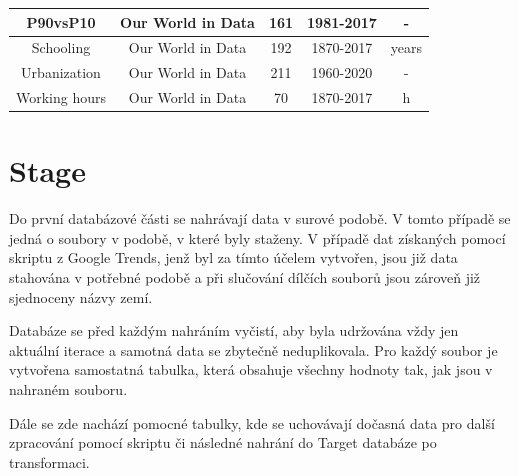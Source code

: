 \documentclass[thesis=M,czech]{FITthesis}[2022/10/08]
\begin{document}
\begin{table}[h]
{\begin{tabular}{@{}ccccc@{}}
\multicolumn{1}{|c|}{P90vsP10 \cite{p90}} &
  \multicolumn{1}{c|}{Our World in Data} &
  \multicolumn{1}{c|}{161} &
  \multicolumn{1}{c|}{1981-2017} &
  \multicolumn{1}{c|}{-} \\ \midrule
\multicolumn{1}{|c|}{Schooling \cite{schooling}} &
  \multicolumn{1}{c|}{Our World in Data} &
  \multicolumn{1}{c|}{192} &
  \multicolumn{1}{c|}{1870-2017} &
  \multicolumn{1}{c|}{years} \\ \midrule
\multicolumn{1}{|c|}{Urbanization \cite{urban}} &
  \multicolumn{1}{c|}{Our World in Data} &
  \multicolumn{1}{c|}{211} &
  \multicolumn{1}{c|}{1960-2020} &
  \multicolumn{1}{c|}{-} \\ \midrule
\multicolumn{1}{|c|}{Working hours \cite{working hours}} &
  \multicolumn{1}{c|}{Our World in Data} &
  \multicolumn{1}{c|}{70} &
  \multicolumn{1}{c|}{1870-2017} &
  \multicolumn{1}{c|}{h} \\ \midrule\bottomrule
\end{tabular}%
}
\end{table}

\section{Stage}

Do první databázové části se nahrávají data v surové podobě. V tomto případě se jedná o soubory v podobě, v které byly staženy. V případě dat získaných pomocí skriptu z Google Trends, jenž byl za tímto účelem vytvořen, jsou již data stahována v potřebné podobě a při slučování dílčích souborů jsou zároveň již sjednoceny názvy zemí. 

Databáze se před každým nahráním vyčistí, aby byla udržována vždy jen aktuální iterace a samotná data se zbytečně neduplikovala. Pro každý soubor je vytvořena samostatná tabulka, která obsahuje všechny hodnoty tak, jak jsou v nahraném souboru.

Dále se zde nachází pomocné tabulky, kde se uchovávají dočasná data pro další zpracování pomocí skriptu či následné nahrání do Target databáze po transformaci.
\end{document}
